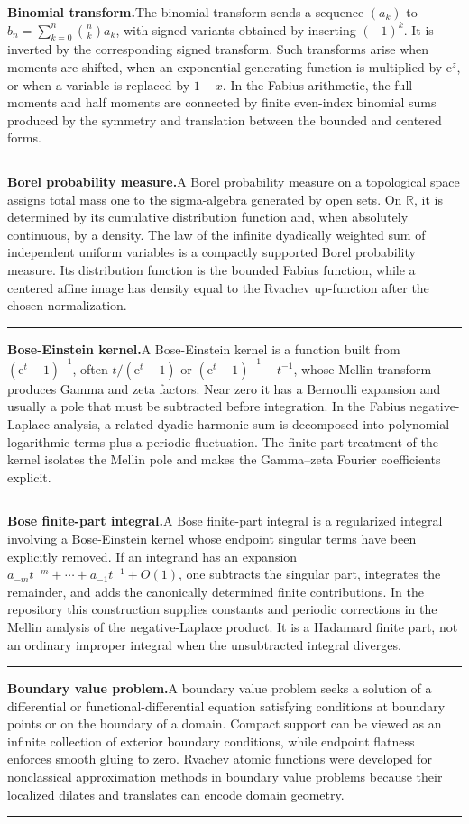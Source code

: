 \documentclass[11pt,oneside]{article}
\newcommand{\R}{\mathbb R}
\newcommand{\e}{\mathrm e}
\newcommand{\glossaryentry}[3]{%
  \par\addvspace{0.95\baselineskip}%
  \phantomsection\hypertarget{gls:#1}{}%
  \noindent\textbf{\large #2.}\enspace #3\par
  \nopagebreak[2]\vspace{0.15\baselineskip}%
  \noindent\color{rulegray}\rule{\linewidth}{0.25pt}\color{black}%
}
\begin{document}
\glossaryentry{binomial-transform}{Binomial transform}{The binomial transform sends a sequence \((a_k)\) to \(b_n=\sum_{k=0}^{n}\binom nk a_k\), with signed variants obtained by inserting \((-1)^k\). It is inverted by the corresponding signed transform. Such transforms arise when moments are shifted, when an exponential generating function is multiplied by \(\e^z\), or when a variable is replaced by \(1-x\). In the Fabius arithmetic, the full moments and half moments are connected by finite even-index binomial sums produced by the symmetry and translation between the bounded and centered forms.}
\glossaryentry{borel-probability-measure}{Borel probability measure}{A Borel probability measure on a topological space assigns total mass one to the sigma-algebra generated by open sets. On \(\R\), it is determined by its cumulative distribution function and, when absolutely continuous, by a density. The law of the infinite dyadically weighted sum of independent uniform variables is a compactly supported Borel probability measure. Its distribution function is the bounded Fabius function, while a centered affine image has density equal to the Rvachev up-function after the chosen normalization.}
\glossaryentry{bose-einstein-kernel}{Bose-Einstein kernel}{A Bose-Einstein kernel is a function built from \((\e^t-1)^{-1}\), often \(t/(\e^t-1)\) or \((\e^t-1)^{-1}-t^{-1}\), whose Mellin transform produces Gamma and zeta factors. Near zero it has a Bernoulli expansion and usually a pole that must be subtracted before integration. In the Fabius negative-Laplace analysis, a related dyadic harmonic sum is decomposed into polynomial-logarithmic terms plus a periodic fluctuation. The finite-part treatment of the kernel isolates the Mellin pole and makes the Gamma--zeta Fourier coefficients explicit.}
\glossaryentry{bose-finite-part-integral}{Bose finite-part integral}{A Bose finite-part integral is a regularized integral involving a Bose-Einstein kernel whose endpoint singular terms have been explicitly removed. If an integrand has an expansion \(a_{-m}t^{-m}+\cdots+a_{-1}t^{-1}+O(1)\), one subtracts the singular part, integrates the remainder, and adds the canonically determined finite contributions. In the repository this construction supplies constants and periodic corrections in the Mellin analysis of the negative-Laplace product. It is a Hadamard finite part, not an ordinary improper integral when the unsubtracted integral diverges.}
\glossaryentry{boundary-value-problem}{Boundary value problem}{A boundary value problem seeks a solution of a differential or functional-differential equation satisfying conditions at boundary points or on the boundary of a domain. Compact support can be viewed as an infinite collection of exterior boundary conditions, while endpoint flatness enforces smooth gluing to zero. Rvachev atomic functions were developed for nonclassical approximation methods in boundary value problems because their localized dilates and translates can encode domain geometry.}
\end{document}
